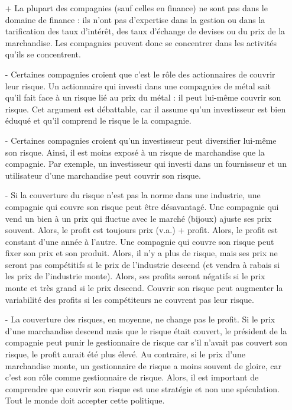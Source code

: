 \begin{itemize}
	\item[+] La plupart des compagnies (sauf celles en finance) ne sont pas dans le domaine de finance : ils n'ont pas d'expertise dans la gestion ou dans la tarification des taux d'intérêt, des taux d'échange de devises ou du prix de la marchandise. Les compagnies peuvent donc se concentrer dans les activités qu'ils se concentrent. 
	\item[-] Certaines compagnies croient que c'est le rôle des actionnaires de couvrir leur risque. Un actionnaire qui investi dans une compagnies de métal sait qu'il fait face à un risque lié au prix du métal : il peut lui-même couvrir son risque. Cet argument est débattable, car il assume qu'un investisseur est bien éduqué et qu'il comprend le risque le la compagnie. 
	\item[-] Certaines compagnies croient qu'un investisseur peut diversifier lui-même son risque. Ainsi, il est moins exposé à un risque de marchandise que la compagnie. Par exemple, un investisseur qui investi dans un fournisseur et un utilisateur d'une marchandise peut couvrir son risque. 
	\item[-] Si la couverture du risque n'est pas la norme dans une industrie, une compagnie qui couvre son risque peut être désavantagé. Une compagnie qui vend un bien à un prix qui fluctue avec le marché (bijoux) ajuste ses prix souvent. Alors, le profit est toujours prix (v.a.) + profit. Alors, le profit est constant d'une année à l'autre. Une compagnie qui couvre son risque peut fixer son prix et son produit. Alors, il n'y a plus de risque, mais ses prix ne seront pas compétitifs si le prix de l'industrie descend (et vendra à rabais si les prix de l'industrie monte). Alors, ses profits seront négatifs si le prix monte et très grand si le prix descend. Couvrir son risque peut augmenter la variabilité des profits si les compétiteurs ne couvrent pas leur risque. 
	\item[-] La couverture des risques, en moyenne, ne change pas le profit. Si le prix d'une marchandise descend mais que le risque était couvert, le président de la compagnie peut punir le gestionnaire de risque car s'il n'avait pas couvert son risque, le profit aurait été plus élevé. Au contraire, si le prix d'une marchandise monte, un gestionnaire de risque a moins souvent de gloire, car c'est son rôle comme gestionnaire de risque. Alors, il est important de comprendre que couvrir son risque est une stratégie et non une spéculation. Tout le monde doit accepter cette politique. 
\end{itemize}

